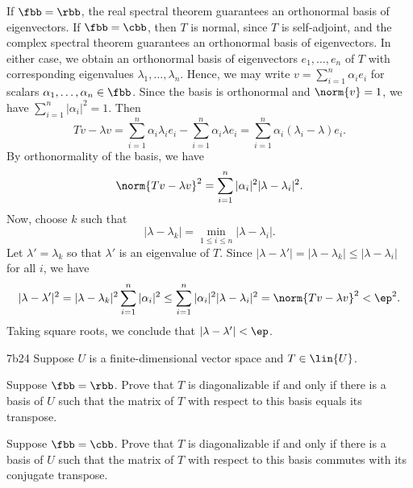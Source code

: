 \begin{sol}
    If $\fbb = \rbb$, the real spectral theorem guarantees an orthonormal basis of eigenvectors. 
    If $\fbb = \cbb$, then $T$ is normal, since $T$ is self-adjoint, and the complex spectral theorem guarantees an orthonormal basis of eigenvectors.
    In either case, we obtain an orthonormal basis of eigenvectors $e_1, \ldots, e_n$ of $T$ with corresponding eigenvalues $\lambda_1, \ldots, \lambda_n$.
    Hence, we may write $v = \sum_{i=1}^n \alpha_i e_i$ for scalars $\alpha_1, \ldots, \alpha_n \in \fbb$.
    Since the basis is orthonormal and $\norm{v} = 1$, we have $\sum_{i=1}^n |\alpha_i|^2 = 1$.
    Then
    \[
        Tv - \lambda v = \sum_{i=1}^n \alpha_i \lambda_i e_i - \sum_{i=1}^n \alpha_i \lambda e_i = \sum_{i=1}^n \alpha_i (\lambda_i - \lambda) e_i.
    \]
    By orthonormality of the basis, we have
    \[
        \norm{Tv - \lambda v}^2 = \sum_{i=1}^n |\alpha_i|^2 |\lambda - \lambda_i|^2.
    \]
    Now, choose $k$ such that
    \[
        |\lambda - \lambda_k| = \min_{1 \leq i \leq n} |\lambda - \lambda_i|.
    \]
    Let $\lambda' = \lambda_k$ so that $\lambda'$ is an eigenvalue of $T$.
    Since $|\lambda - \lambda'| = |\lambda - \lambda_k| \leq |\lambda - \lambda_i|$ for all $i$, we have
    \[
        |\lambda - \lambda'|^2 = |\lambda - \lambda_k|^2 \sum_{i=1}^n |\alpha_i|^2 \leq \sum_{i=1}^n |\alpha_i|^2 |\lambda - \lambda_i|^2 = \norm{Tv - \lambda v}^2 < \ep^2.
    \]
    Taking square roots, we conclude that $|\lambda - \lambda'| < \ep$.
\end{sol}

\begin{exercise}{7b24}
    Suppose $U$ is a finite-dimensional vector space and $T \in \lin{U}$.
    \begin{subexercises}
        \item Suppose $\fbb = \rbb$.
        Prove that $T$ is diagonalizable if and only if there is a basis of $U$ such that the matrix of $T$ with respect to this basis equals its transpose.
        \item Suppose $\fbb = \cbb$.
        Prove that $T$ is diagonalizable if and only if there is a basis of $U$ such that the matrix of $T$ with respect to this basis commutes with its conjugate transpose.
    \end{subexercises}
\end{exercise}

